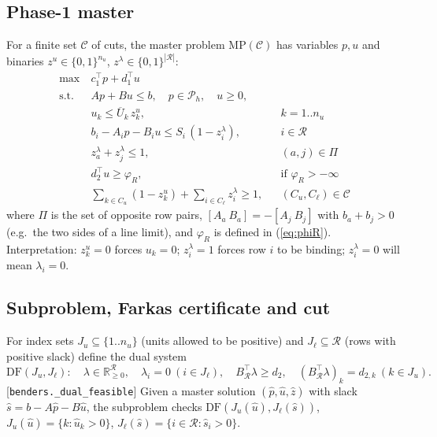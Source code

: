 \subsection{Phase-1 master}
For a finite set $\mathcal C$ of cuts, the master problem $\mathrm{MP}(\mathcal C)$ has
variables $p,u$ and binaries $z^u\in\{0,1\}^{n_u}$, $z^\lambda\in\{0,1\}^{|\mathcal R|}$:
\begin{align}
\max\ & c_1^\top p+d_1^\top u \label{eq:mp-obj}\\
\text{s.t. } & Ap+Bu\le b,\quad p\in\mathcal P_h,\quad u\ge0, \tag{M1}\label{eq:M1}\\
& u_k\le\overline U_k\,z^u_k, && k=1..n_u \tag{M2}\label{eq:M2}\\
& b_i-A_ip-B_iu\le S_i\,(1-z^\lambda_i), && i\in\mathcal R \tag{M3}\label{eq:M3}\\
& z^\lambda_a+z^\lambda_j\le1, && (a,j)\in\Pi \tag{M4}\label{eq:M4}\\
& d_2^\top u\ge\varphi_R, && \text{if }\varphi_R>-\infty \tag{M5}\label{eq:M5}\\
& \textstyle\sum_{k\in C_u}(1-z^u_k)+\sum_{i\in C_\ell}z^\lambda_i\ge1, && (C_u,C_\ell)\in\mathcal C \tag{M6}\label{eq:M6}
\end{align}
where $\Pi$ is the set of opposite row pairs, $[A_a\ B_a]=-[A_j\ B_j]$ with $b_a+b_j>0$
(e.g.\ the two sides of a line limit), and $\varphi_R$ is defined in (\ref{eq:phiR}).
Interpretation: $z^u_k=0$ forces $u_k=0$; $z^\lambda_i=1$ forces row $i$ to be binding;
$z^\lambda_i=0$ will mean $\lambda_i=0$.

\subsection{Subproblem, Farkas certificate and cut}
For index sets $J_u\subseteq\{1..n_u\}$ (units allowed to be positive) and
$J_\ell\subseteq\mathcal R$ (rows with positive slack) define the dual system
\begin{equation}
\mathrm{DF}(J_u,J_\ell):\quad \lambda\in\mathbb R^{\mathcal R}_{\ge0},\quad \lambda_i=0\ (i\in J_\ell),\quad
B_{\mathcal R}^\top\lambda\ge d_2,\quad (B_{\mathcal R}^\top\lambda)_k=d_{2,k}\ (k\in J_u).
\label{eq:DF}
\end{equation}
[\texttt{benders.\_dual\_feasible}] Given a master solution $(\hat p,\hat u,\hat z)$ with slack
$\hat s=b-A\hat p-B\hat u$, the subproblem checks $\mathrm{DF}(J_u(\hat u),J_\ell(\hat s))$,
$J_u(\hat u)=\{k:\hat u_k>0\}$, $J_\ell(\hat s)=\{i\in\mathcal R:\hat s_i>0\}$.

